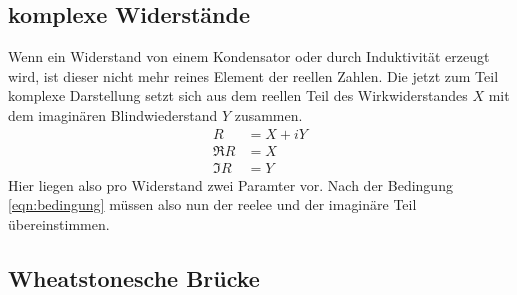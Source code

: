 \subsection{komplexe Widerstände}
Wenn ein Widerstand von einem Kondensator oder durch Induktivität erzeugt wird, ist dieser nicht mehr reines 
Element der reellen Zahlen. 
Die jetzt zum Teil komplexe Darstellung setzt sich aus dem reellen Teil des Wirkwiderstandes $X$ mit 
dem imaginären Blindwiederstand $Y$ zusammen. 
\begin{align*}
    R &= X +iY \\
    \Re{R} &= X \\
    \Im{R} &= Y 
\end{align*} 
Hier liegen also pro Widerstand zwei Paramter vor. Nach der Bedingung \eqref{eqn:bedingung} müssen also
nun der reelee und der imaginäre Teil übereinstimmen. 

\subsection{Wheatstonesche Brücke}
















